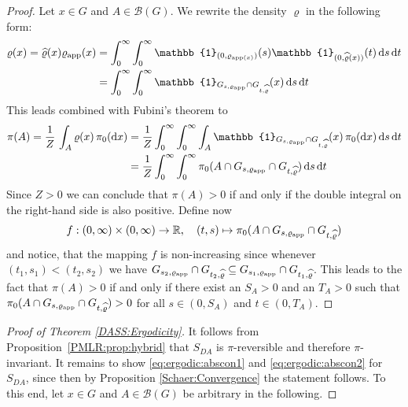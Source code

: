 \documentclass[sn-mathphys-num]{sn-jnl}%
\theoremstyle{thmstyleone}%
\theoremstyle{thmstyletwo}%
\theoremstyle{thmstylethree}%
\newcommand{\rhoapp}{\varrho_{{\rm app}}}
\begin{document}
\begin{appendices}
\begin{proof}
    Let $x\in G$ and $A\in\mathcal{B}(G)$. We rewrite the density $\varrho$ in the following form:
    \begin{align*}
        \varrho(x)  = \widehat{\varrho}(x)  \rhoapp(x) & = \int_0^{\infty} \int_0^{\infty} \mathbb{1}_{(0,\varrho_{\textmd{app}(x)})}(s) \mathbb{1}_{(0,\widehat{\varrho}(x))}(t)  \,  \mathrm{d}s  \, \mathrm{d}t\\
        & = \int_0^{\infty} \int_0^{\infty} \mathbb{1}_{G_{s, \varrho_{\textmd{app}}}\cap G_{t, \widehat{\varrho}}}(x)  \, \mathrm{d}s  \, \mathrm{d}t
    \end{align*}
    This leads combined with Fubini's theorem to
    \begin{align}
        \pi(A)  = \frac {1}{Z} \, \int_A \varrho(x) \, \pi_0(\mathrm{d}x) & = \frac {1}{Z} \int_0^{\infty} \int_0^{\infty}  \int_A \mathbb{1}_{G_{s, \varrho_{\textmd{app}}}\cap G_{t, \widehat{\varrho}}}(x) \, \pi_0(\mathrm{d}x)  \, \mathrm{d}s  \, \mathrm{d}t \notag \\
        & = \frac {1}{Z} \int_0^{\infty} \int_0^{\infty} \pi_0(A \cap G_{s, \varrho_{\textmd{app}}}\cap G_{t, \widehat{\varrho}})  \, \mathrm{d}s  \, \mathrm{d}t \label{eq:pi}
    \end{align}
    Since $Z>0$ we can conclude that $\pi(A)>0$ if and only if the double integral on the right-hand side is also positive. Define now
    \begin{align*}
       f: (0,\infty)\times(0,\infty) \rightarrow \mathbb R, \quad (t,s) \mapsto \pi_0(A \cap G_{s, \varrho_{\textmd{app}}}\cap G_{t, \widehat{\varrho}})    
    \end{align*}
    and notice, that the mapping $f$ is non-increasing since whenever $(t_1,s_1)<(t_2,s_2)$ we have $G_{s_2, \varrho_{\textmd{app}}}\cap G_{t_2, \widehat{\varrho}}\subseteq G_{s_1, \varrho_{\textmd{app}}}\cap G_{t_1, \widehat{\varrho}}$. This leads to the fact that $\pi(A)>0$ if and only if there exist an $S_A>0$ and an $T_A>0$ such that $\pi_0(A \cap G_{s, \varrho_{\textmd{app}}}\cap G_{t, \widehat{\varrho}})>0$ for all $s\in(0, S_A)$ and $t\in(0, T_A)$.
\end{proof}

\begin{proof}[Proof of Theorem \ref{DASS:Ergodicity}]
It follows from Proposition~\ref{PMLR:prop:hybrid} that \(S_{DA}\) is \(\pi\)-reversible and therefore \(\pi\)-invariant. 
It remains to show \eqref{eq:ergodic:abscon1} and \eqref{eq:ergodic:abscon2} for $S_{DA}$, since then by Proposition \ref{Schaer:Convergence} the statement follows.
To this end, let $x\in G$ and $A\in\mathcal{B}(G)$ be arbitrary in the following. 


\end{proof}
\end{appendices}
\end{document}
